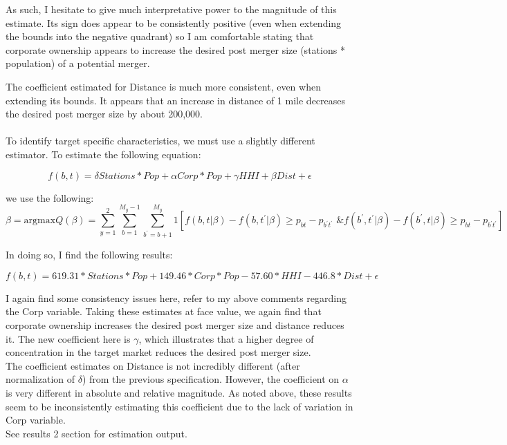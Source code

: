 \documentclass{article}
\begin{document}
As such, I hesitate to give much interpretative power to the magnitude of this estimate. Its sign does appear to be consistently positive (even when extending the bounds into the negative quadrant) so I am comfortable stating that corporate ownership appears to increase the desired post merger size (stations * population) of a potential merger.

The coefficient estimated for Distance is much more consistent, even when extending its bounds. It appears that an increase in distance of 1 mile decreases the desired post merger size by about 200,000. \\
\\

To identify target specific characteristics, we must use a slightly different estimator. To estimate the following equation:

$$f(b, t) = \delta Stations * Pop + \alpha Corp * Pop + \gamma HHI + \beta Dist  + \epsilon$$

we use the following:
$$\beta = \text{argmax} Q(\beta) = \sum_{y=1}^{2} \sum_{b = 1}^{M_y -1}\sum_{b^\prime = b+1}^{M_y} 1[f(b, t|\beta) - f(b, t^\prime|\beta) \geq p_{bt} - p_{b^\prime t^\prime} \text{ \& } f(b^\prime, t^\prime|\beta) - f(b^\prime, t|\beta) \geq p_{bt} - p_{b^\prime t^\prime}]$$

In doing so, I find the following results:

$$f(b, t) = 619.31 * Stations * Pop + 149.46 * Corp * Pop - 57.60 * HHI - 446.8 * Dist  + \epsilon$$

I again find some consistency issues here, refer to my above comments regarding the Corp variable. Taking these estimates at face value, we again find that corporate ownership increases the desired post merger size and distance reduces it. The new coefficient here is $\gamma$, which illustrates that a higher degree of concentration in the target market reduces the desired post merger size.\\

The coefficient estimates on Distance is not incredibly different (after normalization of $\delta$) from the previous specification. However, the coefficient on $\alpha$ is very different in absolute and relative magnitude. As noted above, these results seem to be inconsistently estimating this coefficient due to the lack of variation in Corp variable.\\

See results 2 section for estimation output.


\newpage
\end{document}
